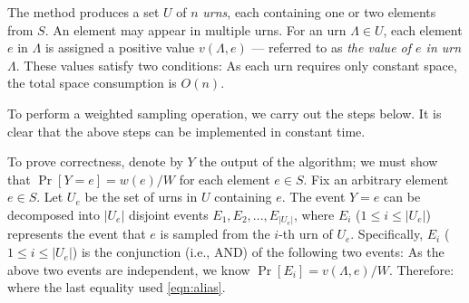  The method produces a set $U$ of $n$ {\em urns}, each containing one or two elements from $S$. An element may appear in multiple urns. For an urn $\Lambda \in U$, each element $e$ in $\Lambda$ is assigned a positive value $v(\Lambda, e)$ --- referred to as {\em the value of $e$ in urn $\Lambda$}. These values satisfy two conditions:
As each urn requires only constant space, the total space consumption is $O(n)$.

 To perform a weighted sampling operation, we carry out the steps below.
It is clear that the above steps can be implemented in constant time.

\vgap

To prove correctness, denote by $Y$ the output of the algorithm; we must show that $\Pr[Y = e] = w(e)/W$ for each element $e \in S$. Fix an arbitrary element $e \in S$. Let $U_e$ be the set of urns in $U$ containing $e$. The event $Y = e$ can be decomposed into $|U_e|$ disjoint events $E_1, E_2, ..., E_{|U_e|}$, where $E_i$ ($1 \le i \le |U_e|$) represents the event that $e$ is sampled from the $i$-th urn of $U_e$. Specifically, $E_i$ ($1 \le i \le |U_e|$) is the conjunction (i.e., AND) of the following two events:
As the above two events are independent, we know $\Pr[E_i] = v(\Lambda, e)/W$. Therefore:
where the last equality used \eqref{eqn:alias}.

